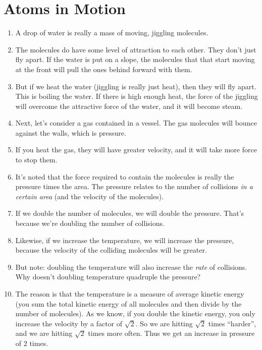 \section{Atoms in Motion}

\begin{enumerate}

  \item A drop of water is really a mass of moving, jiggling 
  molecules.

  \item The molecules do have some level of attraction to each other.
  They don't just fly apart. If the water is put on a slope, the
  molecules that that start moving at the front will pull the ones
  behind forward with them.

  \item But if we heat the water (jiggling is really just heat), then
  they will fly apart. This is boiling the water. If there is high
  enough heat, the force of the jiggling will overcome the attractive
  force of the water, and it will become steam.

  \item Next, let's consider a gas contained in a vessel. The gas
  molecules will bounce against the walls, which is pressure.

  \item If you heat the gas, they will have greater velocity, and it
  will take more force to stop them.

  \item It's noted that the force required to contain the molecules is
  really the pressure times the area. The pressure relates to the number
  of collisions \emph{in a certain area} (and the velocity of the
  molecules).

  \item If we double the number of molecules, we will double the
  pressure. That's because we're doubling the number of collisions.

  \item Likewise, if we increase the temperature, we will increase the
  pressure, because the velocity of the colliding molecules will be
  greater.

  \item But note: doubling the temperature will also increase the
  \emph{rate} of collisions. Why doesn't doubling temperature quadruple
  the pressure?

  \item The reason is that the temperature is a measure of average
  kinetic energy (you sum the total kinetic energy of all molecules and
  then divide by the number of molecules). As we know, if you double the
  kinetic energy, you only increase the velocity by a factor of
  $\sqrt{2}$. So we are hitting $\sqrt{2}$ times ``harder'', and we are
  hitting $\sqrt{2}$ times more often. Thus we get an increase in
  pressure of $2$ times.


\end{enumerate}
